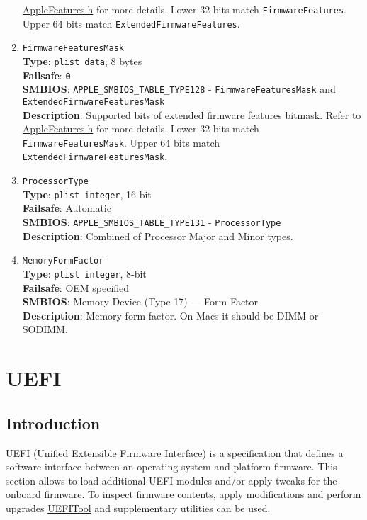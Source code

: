 \documentclass[]{article}
\begin{document}
\begin{enumerate}
  \href{https://github.com/acidanthera/OpenCorePkg/blob/master/Include/Apple/IndustryStandard/AppleFeatures.h}{AppleFeatures.h}
  for more details. Lower 32 bits match \texttt{FirmwareFeatures}. Upper
  64 bits match \texttt{ExtendedFirmwareFeatures}.
\item
  \texttt{FirmwareFeaturesMask}\\
  \textbf{Type}: \texttt{plist\ data}, 8 bytes\\
  \textbf{Failsafe}: \texttt{0}\\
  \textbf{SMBIOS}: \texttt{APPLE\_SMBIOS\_TABLE\_TYPE128} -
  \texttt{FirmwareFeaturesMask} and
  \texttt{ExtendedFirmwareFeaturesMask}\\
  \textbf{Description}: Supported bits of extended firmware features
  bitmask. Refer to
  \href{https://github.com/acidanthera/OpenCorePkg/blob/master/Include/Apple/IndustryStandard/AppleFeatures.h}{AppleFeatures.h}
  for more details. Lower 32 bits match \texttt{FirmwareFeaturesMask}.
  Upper 64 bits match \texttt{ExtendedFirmwareFeaturesMask}.
\item
  \texttt{ProcessorType}\\
  \textbf{Type}: \texttt{plist\ integer}, 16-bit\\
  \textbf{Failsafe}: Automatic\\
  \textbf{SMBIOS}: \texttt{APPLE\_SMBIOS\_TABLE\_TYPE131} -
  \texttt{ProcessorType}\\
  \textbf{Description}: Combined of Processor Major and Minor types.
\item
  \texttt{MemoryFormFactor}\\
  \textbf{Type}: \texttt{plist\ integer}, 8-bit\\
  \textbf{Failsafe}: OEM specified\\
  \textbf{SMBIOS}: Memory Device (Type 17) --- Form Factor\\
  \textbf{Description}: Memory form factor. On Macs it should be DIMM or
  SODIMM.
\end{enumerate}

\section{UEFI}\label{uefi}

\subsection{Introduction}\label{uefiintro}

\href{https://uefi.org/specifications}{UEFI} (Unified Extensible Firmware Interface)
is a specification that defines a software interface between an operating system and
platform firmware. This section allows to load additional UEFI modules and/or apply
tweaks for the onboard firmware. To inspect firmware contents, apply modifications
and perform upgrades \href{https://github.com/LongSoft/UEFITool/releases}{UEFITool}
and supplementary utilities can be used.
\end{document}
